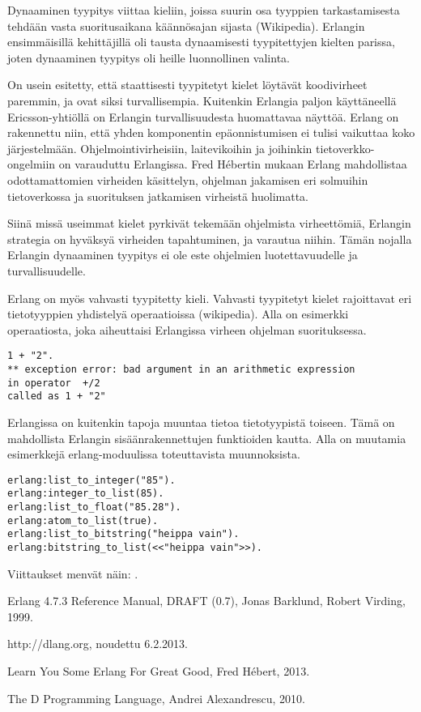 \documentclass[11pt,oneside,a4paper]{article}
\begin{document}
Dynaaminen tyypitys viittaa kieliin, joissa suurin osa tyyppien tarkastamisesta
tehdään vasta suoritusaikana käännösajan sijasta (Wikipedia). Erlangin
ensimmäisillä kehittäjillä oli tausta dynaamisesti tyypitettyjen kielten
parissa, joten dynaaminen tyypitys oli heille luonnollinen valinta. 

On usein esitetty, että staattisesti tyypitetyt kielet löytävät koodivirheet
paremmin, ja ovat siksi turvallisempia. Kuitenkin Erlangia paljon käyttäneellä
Ericsson-yhtiöllä on Erlangin turvallisuudesta huomattavaa näyttöä. Erlang on
rakennettu niin, että yhden komponentin epäonnistumisen ei tulisi vaikuttaa koko
järjestelmään. Ohjelmointivirheisiin, laitevikoihin ja joihinkin
tietoverkko-ongelmiin on varauduttu Erlangissa. Fred Hébertin mukaan Erlang
mahdollistaa odottamattomien virheiden käsittelyn, ohjelman jakamisen eri
solmuihin tietoverkossa ja suorituksen jatkamisen virheistä huolimatta.

Siinä missä useimmat kielet pyrkivät tekemään ohjelmista virheettömiä, Erlangin
strategia on hyväksyä virheiden tapahtuminen, ja varautua niihin. Tämän nojalla
Erlangin dynaaminen tyypitys ei ole este ohjelmien luotettavuudelle ja
turvallisuudelle.

Erlang on myös vahvasti tyypitetty kieli. Vahvasti tyypitetyt kielet rajoittavat
eri tietotyyppien yhdistelyä operaatioissa (wikipedia). Alla on esimerkki
operaatiosta, joka aiheuttaisi Erlangissa virheen ohjelman suorituksessa.

\begin{verbatim}
1 + "2".
** exception error: bad argument in an arithmetic expression
in operator  +/2
called as 1 + "2"
\end{verbatim}
Erlangissa on kuitenkin tapoja muuntaa tietoa tietotyypistä toiseen. Tämä on
mahdollista Erlangin sisäänrakennettujen funktioiden kautta. Alla on muutamia
esimerkkejä erlang-moduulissa toteuttavista muunnoksista.

\begin{verbatim}
erlang:list_to_integer("85").
erlang:integer_to_list(85).
erlang:list_to_float("85.28").
erlang:atom_to_list(true).
erlang:list_to_bitstring("heippa vain").
erlang:bitstring_to_list(<<"heippa vain">>).
\end{verbatim}

Viittaukset menvät näin: \cite{HEB13}.




\begin{thebibliography}{99}

 Erlang 4.7.3 Reference Manual, DRAFT (0.7), Jonas
Barklund, Robert Virding, 1999. 

 http://dlang.org, noudettu 6.2.2013.

 Learn You Some Erlang For Great Good, Fred Hébert, 2013.

 The D Programming Language, Andrei Alexandrescu, 2010.

\end{thebibliography}
\end{document}
